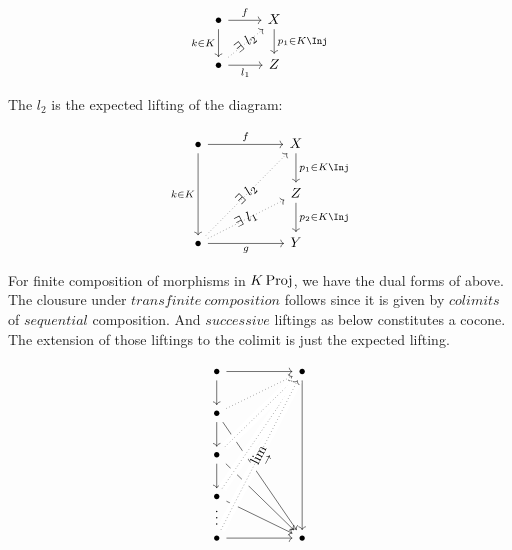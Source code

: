 \begin{prf}
            \[\begin{tikzcd}
                \bullet & X \\
                \bullet & Z
                \arrow["{ f}", from=1-1, to=1-2]
                \arrow["{p_1 \in K \Inj}", from=1-2, to=2-2]
                \arrow["{l_1}"', from=2-1, to=2-2]
                \arrow["{k \in K}"', from=1-1, to=2-1]
                \arrow["\E \ l_2"{marking}, dotted, from=2-1, to=1-2]
            \end{tikzcd}\]

            \par The $l_2$ is the expected lifting of the diagram:

            \[\begin{tikzcd}[row sep = 0.75cm, column sep = 0.95cm]
                \bullet && X \\
                && Z \\
                \bullet && Y
                \arrow["{k \in K}"', from=1-1, to=3-1]
                \arrow["g"', from=3-1, to=3-3]
                \arrow["f", from=1-1, to=1-3]
                \arrow["{p_1 \in K \Inj}", from=1-3, to=2-3]
                \arrow["{p_2\in K \Inj}", from=2-3, to=3-3]
                \arrow["{\E\ l_1}"{marking}, dotted, from=3-1, to=2-3]
                \arrow["{\E\ l_2}"{marking}, dotted, from=3-1, to=1-3]
            \end{tikzcd}\]

            \par For finite composition of morphisms in $K \operatorname{\rm{Proj}}$, we have the dual forms of above.
            The clousure under $transfinite\ composition$ follows since it is given by
            $colimits$ of $sequential$ composition.
            And $successive$ liftings as below constitutes a cocone.
            The extension of those liftings to the colimit is just the expected lifting.

            \[\begin{tikzcd}
                \bullet && \bullet \\
                \bullet \\
                \bullet \\
                \bullet \\
                \bullet && \bullet
                \arrow[from=5-1, to=5-3]
                \arrow[from=1-3, to=5-3]
                \arrow[from=1-1, to=2-1]
                \arrow[from=2-1, to=3-1]
                \arrow["\cdots"{marking}, draw=none, from=4-1, to=5-1]
                \arrow[from=1-1, to=1-3]
                \arrow[from=3-1, to=5-3]
                \arrow[from=2-1, to=5-3]
                \arrow[dotted, from=2-1, to=1-3]
                \arrow[dotted, from=3-1, to=1-3, crossing over]
                \arrow[from=3-1, to=4-1]
                \arrow[dotted, from=4-1, to=1-3, crossing over]
                \arrow[from=4-1, to=5-3]
                \arrow["{\underset{\to}{\lim}}"{marking}, dotted, from=5-1, to=1-3, crossing over]
            \end{tikzcd}\]
        

\end{prf}
